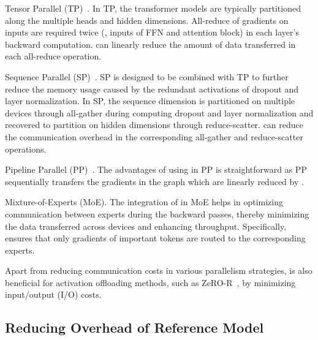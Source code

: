 \begin{icompact}
    \item Tensor Parallel (TP)~\cite{MegatronLM}. In TP, the transformer models are typically partitioned along the multiple heads and hidden dimensions. All-reduce of gradients on inputs are required twice (\ie, inputs of FFN and attention block) in each layer's backward computation. \solution can linearly reduce the amount of data transferred in each all-reduce operation.
    \item Sequence Parallel (SP)~\cite{SP}. SP is designed to be combined with TP to further reduce the memory usage caused by the redundant activations of dropout and layer normalization. In SP, the sequence dimension is partitioned on multiple devices through all-gather during computing dropout and layer normalization and recovered to partition on hidden dimensions through reduce-scatter. \solution can reduce the communication overhead in the corresponding all-gather and reduce-scatter operations.
    \item Pipeline Parallel (PP)~\cite{MegatronLM}. The advantages of using \solution in PP is straightforward as PP sequentially transfers the gradients in the graph which are linearly reduced by \solution.
    \item Mixture-of-Experts (MoE). The integration of \solution in MoE helps in optimizing communication between experts during the backward passes, thereby minimizing the data transferred across devices and enhancing throughput. Specifically, \solution ensures that only gradients of important tokens are routed to the corresponding experts.
\end{icompact}

Apart from reducing communication costs in various parallelism strategies, \solution is also beneficial for activation offloading methods, such as ZeRO-R~\cite{deepspeed}, by minimizing input/output (I/O) costs.

\subsection{Reducing Overhead of Reference Model} \label{sec:discussion:reducing_refmodel_overheads}

